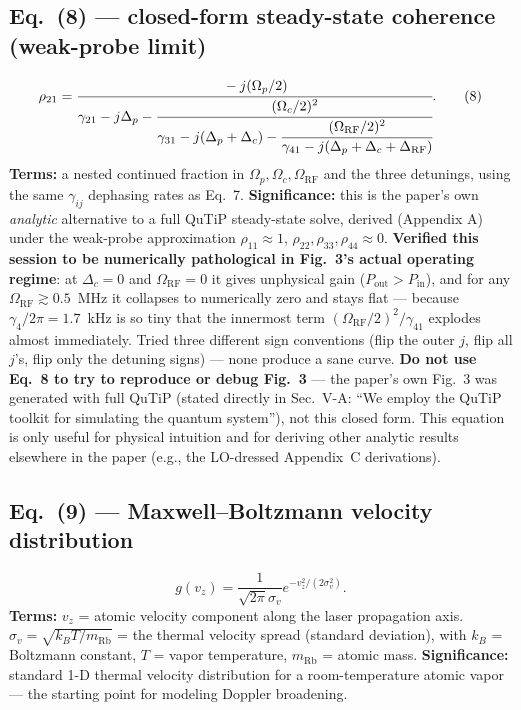 \documentclass[11pt]{article}
\begin{document}
\subsection*{Eq.~(8) --- closed-form steady-state coherence (weak-probe limit)}
\begin{equation}
\rho_{21} = \cfrac{-j(\Omega_p/2)}{\gamma_{21}-j\Delta_p-\cfrac{(\Omega_c/2)^2}{\gamma_{31}-j(\Delta_p+\Delta_c)-\cfrac{(\Omega_\text{RF}/2)^2}{\gamma_{41}-j(\Delta_p+\Delta_c+\Delta_\text{RF})}}}. \tag{8}
\end{equation}
\textbf{Terms:} a nested continued fraction in $\Omega_p,\Omega_c,\Omega_\text{RF}$
and the three detunings, using the same $\gamma_{ij}$ dephasing rates as
Eq.~7.
\textbf{Significance:} this is the paper's own \emph{analytic}
alternative to a full QuTiP steady-state solve, derived (Appendix A)
under the weak-probe approximation $\rho_{11}\approx1$,
$\rho_{22},\rho_{33},\rho_{44}\approx0$. \textbf{Verified this session
to be numerically pathological in Fig.~3's actual operating regime}: at
$\Delta_c=0$ and $\Omega_\text{RF}=0$ it gives unphysical gain
($P_\text{out}>P_\text{in}$), and for any $\Omega_\text{RF}\gtrsim0.5$~MHz
it collapses to numerically zero and stays flat --- because
$\gamma_4/2\pi=1.7$~kHz is so tiny that the innermost term
$(\Omega_\text{RF}/2)^2/\gamma_{41}$ explodes almost immediately. Tried
three different sign conventions (flip the outer $j$, flip all $j$'s,
flip only the detuning signs) --- none produce a sane curve. \textbf{Do
not use Eq.~8 to try to reproduce or debug Fig.~3} --- the paper's own
Fig.~3 was generated with full QuTiP (stated directly in Sec.~V-A: ``We
employ the QuTiP toolkit for simulating the quantum system''), not this
closed form. This equation is only useful for physical intuition and
for deriving other analytic results elsewhere in the paper (e.g., the
LO-dressed Appendix~C derivations).

\subsection*{Eq.~(9) --- Maxwell--Boltzmann velocity distribution}
\begin{equation}
g(v_z) = \frac{1}{\sqrt{2\pi}\sigma_v}e^{-v_z^2/(2\sigma_v^2)}. \tag{9}
\end{equation}
\textbf{Terms:} $v_z$ = atomic velocity component along the laser
propagation axis. $\sigma_v=\sqrt{k_BT/m_\text{Rb}}$ = the thermal
velocity spread (standard deviation), with $k_B$ = Boltzmann constant,
$T$ = vapor temperature, $m_\text{Rb}$ = atomic mass.
\textbf{Significance:} standard 1-D thermal velocity distribution for a
room-temperature atomic vapor --- the starting point for modeling
Doppler broadening.
\end{document}

